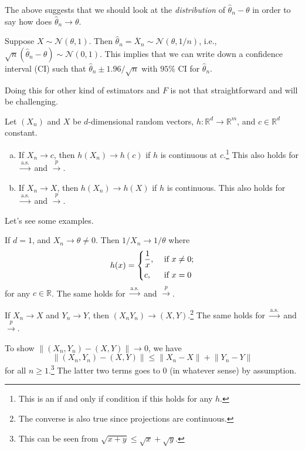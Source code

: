 The above suggests that we should look at the \emph{distribution} of \(\hat{\theta} _n - \theta \) in order to say how does \(\hat{\theta} _n \to \theta \).

\begin{eg}
	Suppose \(X \sim \mathcal{N} (\theta , 1)\). Then \(\hat{\theta} _n = \overline{X} _n \sim \mathcal{N} (\theta , 1 / n)\), i.e., \(\sqrt{n} (\hat{\theta} _n - \theta ) \sim \mathcal{N} (0, 1)\). This implies that we can write down a confidence interval (CI) such that \(\hat{\theta} _n \pm 1.96 / \sqrt{n} \) with \(95\%\) CI for \(\hat{\theta} _n\).
\end{eg}

Doing this for other kind of estimators and \(F\) is not that straightforward and will be challenging.

\begin{remark}
	Let \((X_n)\) and \(X\) be \(d\)-dimensional random vectors, \(h \colon \mathbb{R} ^d \to \mathbb{R} ^m\), and \(c \in \mathbb{R} ^d\) constant.
	\begin{enumerate}[(a)]
		\item If \(X_n \to c\), then \(h(X_n) \to h(c)\) if \(h\) is continuous at \(c\).\footnote{This is an if and only if condition if this holds for any \(h\).}  This also holds for \(\overset{\text{a.s.} }{\to } \) and \(\overset{p}{\to } \).
		\item If \(X_n \to X\), then \(h(X_n) \to h(X)\) if \(h\) is continuous. This also holds for \(\overset{\text{a.s.} }{\to } \) and \(\overset{p}{\to } \).
	\end{enumerate}
\end{remark}

Let's see some examples.

\begin{eg}
	If \(d = 1\), and \(X_n \to \theta \neq 0\). Then \(1 / X_n \to 1 / \theta \) where
	\[
		h(x) = \begin{dcases}
			\frac{1}{x}, & \text{ if } x \neq 0 ; \\
			c,           & \text{ if } x = 0
		\end{dcases}
	\]
	for any \(c \in \mathbb{R} \). The same holds for \(\overset{\text{a.s.} }{\to } \) and \(\overset{p}{\to } \).
\end{eg}

\begin{eg}
	If \(X_n \to X\) and \(Y_n \to Y\), then \((X_n Y_n) \to (X, Y)\).\footnote{The converse is also true since projections are continuous.} The same holds for \(\overset{\text{a.s.} }{\to } \) and \(\overset{p}{\to } \).
\end{eg}
\begin{explanation}
	To show \(\lVert (X_n, Y_n) - (X, Y) \rVert \to 0\), we have
	\[
		\lVert (X_n, Y_n ) - (X, Y) \rVert
		\leq \lVert X_n - X \rVert + \lVert Y_n - Y \rVert
	\]
	for all \(n \geq 1\).\footnote{This can be seen from \(\sqrt{x + y} \leq \sqrt{x} + \sqrt{y} \).} The latter two terms goes to \(0\) (in whatever sense) by assumption.
\end{explanation}